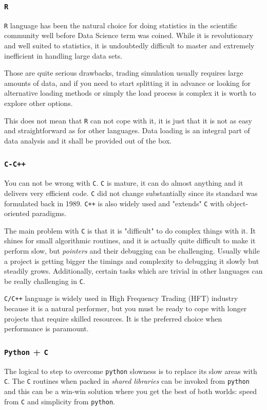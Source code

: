 \subsubsection{\texttt{R}}
\texttt{R} language has been the natural choice for doing statistics in the scientific community well before Data Science term was coined. While it is revolutionary and well suited to statistics, it is undoubtedly difficult to master and extremely inefficient in handling large data sets. 

Those are quite serious drawbacks, trading simulation usually requires large amounts of data, and if you need to start splitting it in advance or looking for alternative loading methods or simply the load process is complex it is worth to explore other options. 

This does not mean that \texttt{R} can not cope with it, it is just that it is not as easy and straightforward as for other languages. Data loading is an integral part of data analysis and it shall be provided out of the box.

\subsubsection{\texttt{C-C++}}
You can not be wrong with \texttt{C}. \texttt{C} is mature, it can do almost anything and it delivers very efficient code. \texttt{C} did not change substantially since its standard was formulated back in 1989. \texttt{C++} is also widely used and "extends" \texttt{C} with object-oriented paradigms.

The main problem with \texttt{C} is that it is "difficult" to do complex things with it. It shines for small algorithmic routines, and it is actually quite difficult to make it perform slow, but \emph{pointers} and their debugging can be challenging.
Usually while a project is getting bigger the timings and complexity to debugging it slowly but steadily grows.
Additionally, certain tasks which are trivial in other languages can be really challenging in \texttt{C}. 

\texttt{C/C++} language is widely used in High Frequency Trading (HFT) industry because it is a natural performer, but you must be ready to cope with longer projects that require skilled resources. It is the preferred choice when performance is paramount. 

\subsubsection{\texttt{Python} + \texttt{C}}
The logical to step to overcome \texttt{python} slowness is to replace its slow areas with \texttt{C}. 
The \texttt{C} routines when packed in \emph{shared libraries} can be invoked from \texttt{python} and this can be a win-win solution where you get the best of both worlds: speed from \texttt{C} and simplicity from \texttt{python}.

